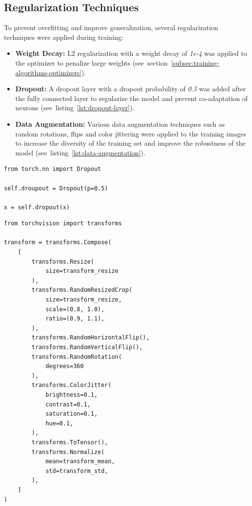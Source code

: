 \subsection{Regularization Techniques}

To prevent overfitting and improve generalization, several regularization techniques were applied during training:

\begin{itemize}
    \item \textbf{Weight Decay:} L2 regularization with a weight decay of \textit{1e-4} was applied to the optimizer to penalize large weights (see~section~\ref{subsec:training-algorithms-optimizers}).
    \item \textbf{Dropout:} A dropout layer with a dropout probability of \textit{0.5} was added after the fully connected layer to regularize the model and prevent co-adaptation of neurons (see~listing~\ref{lst:dropout-layer}).
    \item \textbf{Data Augmentation:} Various data augmentation techniques such as random rotations, flips and color jittering were applied to the training images to increase the diversity of the training set and improve the robustness of the model (see~listing~\ref{lst:data-augmentation}).
\end{itemize}

\begin{minipage}{0.9\linewidth}\begin{lstlisting}[caption={Dropout layer with probability 0.5.},label={lst:dropout-layer}]
from torch.nn import Dropout

self.droupout = Dropout(p=0.5)

x = self.dropout(x)
\end{lstlisting}\end{minipage}

\begin{minipage}{0.9\linewidth}\begin{lstlisting}[caption={Data augmentation transforms.},label={lst:data-augmentation}]
from torchvision import transforms

transform = transforms.Compose(
    [
        transforms.Resize(
            size=transform_resize
        ),
        transforms.RandomResizedCrop(
            size=transform_resize,
            scale=(0.8, 1.0),
            ratio=(0.9, 1.1),
        ),
        transforms.RandomHorizontalFlip(),
        transforms.RandomVerticalFlip(),
        transforms.RandomRotation(
            degrees=360
        ),
        transforms.ColorJitter(
            brightness=0.1,
            contrast=0.1,
            saturation=0.1,
            hue=0.1,
        ),
        transforms.ToTensor(),
        transforms.Normalize(
            mean=transform_mean,
            std=transform_std,
        ),
    ]
)
\end{lstlisting}\end{minipage}
